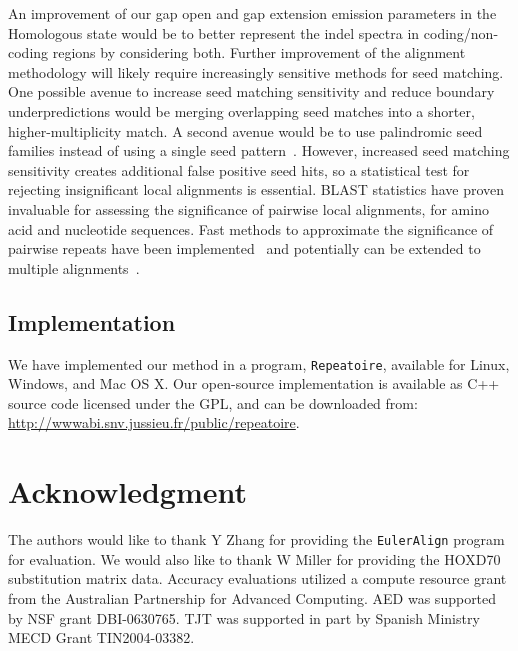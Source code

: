 \documentclass[12pt,journal,letterpaper,onecolumn, draftcls]{IEEEtran}
\begin{document}
An improvement of our gap open and gap extension emission parameters in the Homologous state would be to better represent the indel spectra in coding/non-coding regions by considering both. Further improvement of the alignment methodology will likely require increasingly sensitive methods for
seed matching. One possible avenue to increase seed matching sensitivity and reduce boundary underpredictions would be merging overlapping seed matches into a
shorter, higher-multiplicity match.  A second avenue would be to use palindromic seed families instead of using a single seed pattern~\cite{ref-pattern}. However, increased seed matching sensitivity creates additional
false positive seed hits, so a statistical test for rejecting
insignificant local alignments is essential.  BLAST statistics have proven
invaluable for assessing the significance of pairwise local alignments, for amino acid and nucleotide sequences.
Fast methods to approximate the significance of pairwise
repeats have been implemented~\cite{repseek} and potentially can be
extended to multiple alignments~\cite{ref-related1, Prakash2005}.

\subsection*{Implementation}
We have implemented our method in a program, \texttt{Repeatoire},
available for Linux, Windows, and Mac OS X. Our open-source
implementation is available as C++ source code licensed under the GPL, and can be downloaded from:
\url{http://wwwabi.snv.jussieu.fr/public/repeatoire}.

\section{ Acknowledgment }
The authors would like to thank Y Zhang for providing the
\texttt{EulerAlign} program for evaluation. We would also like to thank
W Miller for providing the HOXD70 substitution matrix data.  Accuracy
evaluations utilized a compute resource grant from the Australian
Partnership for Advanced Computing.  AED was supported by NSF grant
DBI-0630765. TJT was supported in part by Spanish Ministry MECD Grant
TIN2004-03382.

\end{document}
